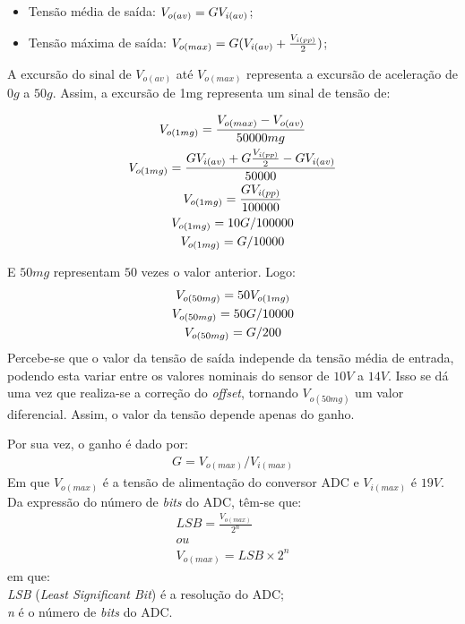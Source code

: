 \documentclass[
	12pt,				%
	openright,			%
	twoside,			%
	a4paper,			%
	english,			%
	french,				%
	spanish,			%
	brazil,				%
	]{abntex2}
\begin{document}
		\begin{itemize}	
			\item Tensão média de saída: $V_{o(av)} = G\* V_{i(av)}$;
			\item Tensão máxima de saída: $V_{o(max)} = G\* (V_{i(av)} + \frac{V_{i(pp)}}{2})$;
		\end{itemize}	
			

		A excursão do sinal de $V_{o(av)}$ até $V_{o(max)}$ representa a excursão de aceleração
		de $0g$ a $50g$. Assim, a excursão de 1mg representa um sinal de tensão de:

		\begin{gather*}
			V_{o(1mg)} = \frac{V_{o(max)} - V_{o(av)}}{50000mg}\\
			V_{o(1mg)} = \frac{G\*V_{i(av)} + G\*\frac{V_{i(pp)}}{2} - G\*V_{i(av)}}{50000}\\
			V_{o(1mg)} = \frac{G\*V_{i(pp)}}{100000}\\
			V_{o(1mg)} = 10\*G/100000\\
			V_{o(1mg)} = G/10000
		\end{gather*}
		
		E $50mg$ representam $50$ vezes o valor anterior. Logo:
		\begin{gather*}
			V_{o(50mg)} =50\*V_{o(1mg)}\\
			V_{o(50mg)} =50\*G/10000\\
			V_{o(50mg)} =G/200
		\end{gather*}
		Percebe-se que o valor da tensão de saída independe da tensão média
		de entrada, podendo esta variar entre os valores nominais do sensor
		de $10V$ a $14V$. Isso se dá uma vez que realiza-se a correção do
		\textit{offset}, tornando $V_{o(50mg)}$ um valor diferencial. Assim,
		o valor da tensão depende apenas do ganho.
		
		Por sua vez, o ganho é dado por:
		\begin{gather*}
			G = V_{o(max)}/V_{i(max)}
		\end{gather*}
		Em que $V_{o(max)}$ é a tensão de alimentação do conversor ADC e $V_{i(max)}$ é
		$19V$. Da expressão do número de \textit{bits} do ADC, têm-se que:
		\begin{gather*}
			LSB = \frac{V_{o(max)}}{2^n}\\
			ou\\
			V_{o(max)} = LSB\times 2^n
		\end{gather*}
		em que:\\
		\textit{LSB} (\textit{Least Significant Bit}) é a resolução do ADC;\\
		\textit{n} é o número de \textit{bits} do ADC.\\
		
\end{document}
